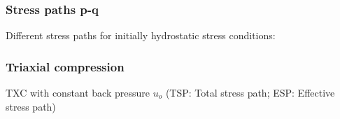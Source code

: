 \documentclass[notes]{beamer}
\begin{document}
\begin{frame}
\frametitle{Stress paths p-q}
Different stress paths for initially hydrostatic stress conditions:
\end{frame}

\begin{frame}
\frametitle{Triaxial compression}
TXC with constant back pressure $u_o$ (TSP: Total stress path; ESP: Effective stress path)
\end{frame}
\end{document}
